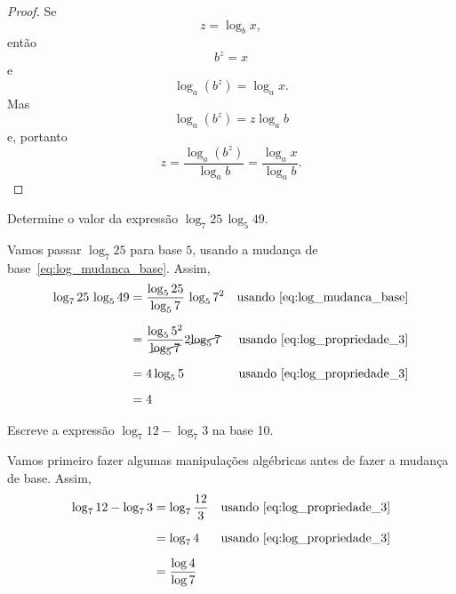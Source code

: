 \begin{proof}
  Se
  \[
    z = \log_b x,
  \]
  então
  \[
    b^z=x
  \]
  e
  \[
    \log_a \left(b^z\right) = \log_a x.
  \]
  Mas
  \[
    \log_a \left(b^z\right) = z \log_a b
  \]
  e, portanto
  \[
    z=\frac{\log_a (b^z)}{\log_a b}=\frac{\log_a x}{\log_a b}.
  \]
\end{proof}

\begin{example}
    Determine o valor da expressão \(\log_7 25\,\log_5 49\).

    \solution
    Vamos passar $\log_7 25$ para base $5$,
    usando a mudança de base~\eqref{eq:log_mudanca_base}.
    Assim,
    \begin{align*}
      \log_7 25 \,\log_5 49
      & = \frac{\log_5 25}{\log_5 7} \, \log_5 7^2                & \text{usando~\eqref{eq:log_mudanca_base}}  \\[2mm]
      & = \frac{\log_5 5^2}{\cancel{\log_5 7}} 2\cancel{\log_5 7} & \text{usando~\eqref{eq:log_propriedade_3}} \\[2mm]
      & = 4 \log_5 5                                              & \text{usando~\eqref{eq:log_propriedade_3}} \\[2mm]
      & = 4
    \end{align*}
\end{example}

\begin{example}
    Escreve a expressão $\log_7 12- \log_7 3$ na base 10.

    \solution
    Vamos primeiro fazer algumas manipulações
    algébricas antes de fazer a mudança de base. Assim,
    \begin{align*}
      \log_7 12 - \log_7 3
      & = \log_7 \frac{12}{3} & \text{usando~\eqref{eq:log_propriedade_3}} \\[2mm]
      & = \log_7 4            & \text{usando~\eqref{eq:log_propriedade_3}} \\[2mm]
      & = \frac{\log 4}{\log 7}
    \end{align*}
\end{example}

